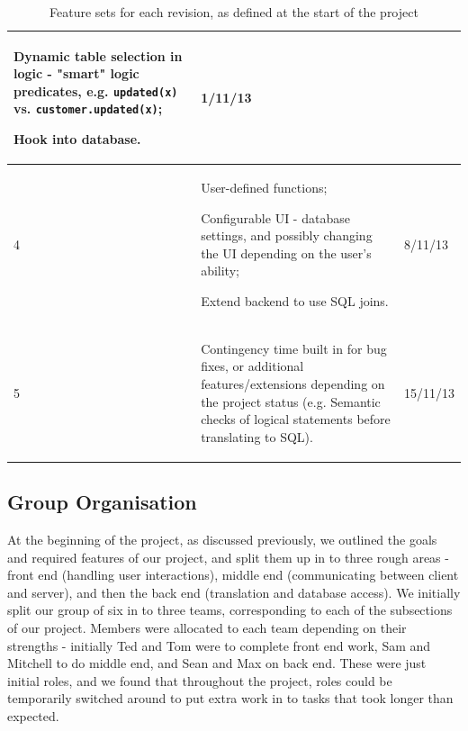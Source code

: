 \documentclass[a4paper, 11pt]{article}
\begin{document}
\begin{table}[H]
\begin{tabular}{| l | p{} | l |}
\begin{compactitem}
            \item Dynamic table selection in logic - "smart" logic predicates,
              e.g. \texttt{updated(x)} vs. \texttt{customer.updated(x)};
            \item Hook into database.
          \end{compactitem}
          & 1/11/13 \\
        \hline
        4 &
          \begin{compactitem}
            \item User-defined functions;
            \item Configurable UI - database settings, and possibly changing the
              UI depending on the user's ability;
            \item Extend backend to use SQL joins.
          \end{compactitem}
          & 8/11/13 \\
        \hline
        5 &
          \begin{compactitem}
            \item Contingency time built in for bug fixes, or additional
              features/extensions depending on the project status (e.g. Semantic
              checks of logical statements before translating to SQL).
          \end{compactitem}
          & 15/11/13 \\
        \hline
      \end{tabular}
      \caption{Feature sets for each revision, as defined at the start of the
        project}
    \end{table}

  \subsection{Group Organisation}
    At the beginning of the project, as discussed previously, we outlined the
    goals and required features of our project, and split them up in to three
    rough areas - front end (handling user interactions),
    middle end (communicating between client and server), and
    then the back end (translation and database access).
    We initially split our group of six in to three teams,
    corresponding to each of the subsections of our project. Members were
    allocated to each team depending on their strengths - initially Ted and Tom
    were to complete front end work, Sam and Mitchell to do middle end, and
    Sean and Max on back end. These were just initial roles, and we found that
    throughout the project, roles could be temporarily switched around to put
    extra work in to tasks that took longer than expected.
\end{document}
